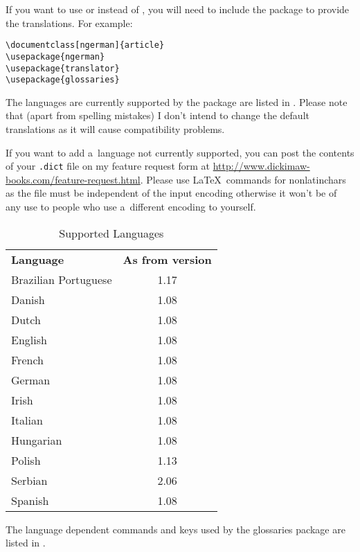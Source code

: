 \documentclass[report,inlinetitle]{nlctdoc}
\begin{document}
If you want to use  or  instead
of , you will need to include the  package 
to provide the translations. For example:
\begin{verbatim}
\documentclass[ngerman]{article}
\usepackage{ngerman}
\usepackage{translator}
\usepackage{glossaries}
\end{verbatim}

The languages are currently supported by the
 package are listed in
. Please note that (apart from
spelling mistakes) I don't intend to change the default translations
as it will cause compatibility problems.

If you want to add a~language not currently supported, you can post 
the contents of your \texttt{.dict} file on my feature request form
at \url{http://www.dickimaw-books.com/feature-request.html}. Please
use \LaTeX\ commands for \glspl{nonlatinchar} as the file must be
independent of the input encoding otherwise it won't be of any use
to people who use a~different encoding to yourself.

\begin{table}[htbp]
\caption{Supported Languages}
\label{tab:supportedlanguages}
\centering
\begin{tabular}{lc}
\bfseries Language & \bfseries As from version\\
Brazilian Portuguese & 1.17\\
Danish & 1.08\\
Dutch & 1.08\\
English & 1.08\\
French & 1.08\\
German & 1.08\\
Irish & 1.08\\
Italian & 1.08\\
Hungarian & 1.08\\
Polish & 1.13\\
Serbian & 2.06\\
Spanish & 1.08
\end{tabular}
\end{table}

The language dependent commands and  keys used by the 
glossaries package are listed in .
\end{document}
